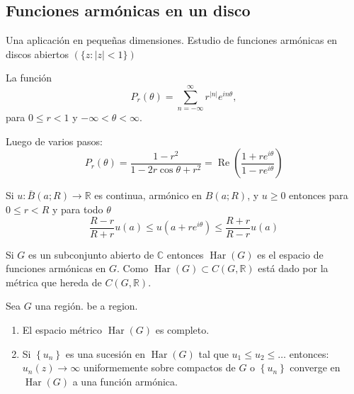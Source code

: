 \subsection{Funciones armónicas en un disco}

Una aplicación en pequeñas dimensiones. Estudio de funciones armónicas en discos abiertos $(\{z:|z|<1\})$ 


\begin{definicion}
    La función
$$
P_r(\theta)=\sum_{n=-\infty}^{\infty} r^{|n|} e^{i n \theta},
$$
para $0 \leq r<1$ y $-\infty<\theta<\infty$.
\begin{cajita}
    Luego de varios pasos: 
    $$P_r(\theta)=\frac{1-r^2}{1-2 r \cos \theta+r^2}=\operatorname{Re}\left(\frac{1+r e^{i \theta}}{1-r e^{i \theta}}\right)$$
\end{cajita}
\end{definicion}


\begin{definicion}
    Si $u: \bar{B}(a ; R) \rightarrow \mathbb{R}$  es continua, armónico en $B(a ; R)$, y $u \geq 0$ entonces para $0 \leq r<R$ y para todo $\theta$
$$
\frac{R-r}{R+r} u(a) \leq u\left(a+r e^{i \theta}\right) \leq \frac{R+r}{R-r} u(a)
$$

\end{definicion}

\begin{definicion}
    Si $G$ es  un subconjunto abierto de $\mathbb{C}$ entonces $\operatorname{Har}(G)$ es el espacio de funciones armónicas en $G$. Como $\operatorname{Har}(G) \subset C(G, \mathbb{R})$ está dado por la métrica que hereda de $C(G, \mathbb{R})$.
\end{definicion}

\begin{definicion}
     Sea $G$  una región. be a region.
     \begin{enumerate}
        \item El espacio métrico $\operatorname{Har}(G)$ es completo.
        \item  Si $\left\{u_n\right\}$  es una sucesión en $\operatorname{Har}(G)$ tal que $u_1 \leq u_2 \leq \ldots$ entonces: $u_n(z) \rightarrow \infty$ uniformemente sobre compactos de $G$ o $\left\{u_n\right\}$ converge en $\operatorname{Har}(G)$ a una función armónica.
     \end{enumerate}
     
\end{definicion}

